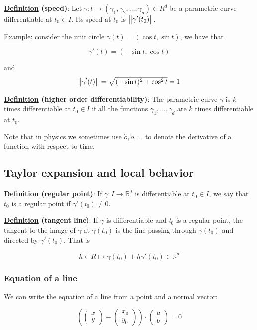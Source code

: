 \documentclass[10pt]{extarticle}
\newcommand{\R}{\mathbb{R}}
\newcommand{\munderbar}[1]{\underbar{\ensuremath{#1}}}
\begin{document}
\textbf{\underline{Definition} (speed)}: Let $\gamma: t \to (\gamma_1, \gamma_2, \ldots, \gamma_d) \in R^d$ be a parametric curve differentiable at $t_0 \in I$.
Its speed at $t_0$ is $\norm{\gamma'(t_0)}$.

\underline{Example}: consider the unit circle $\gamma(t) = (\cos t, \sin t)$, we have that

$$
    \gamma'(t) = (-\sin t, \cos t)
$$

and
$$
    \norm{\gamma'(t)} = \sqrt{(-\sin t)^2 + \cos^2 t} = 1
$$

\textbf{\underline{Definition} (higher order differentiability)}:
The parametric curve $\gamma$ is $k$ times differentiable at $t_0 \in I$ if all the functions $\gamma_1, \ldots, \gamma_d$ are $k$ times differentiable at $t_0$.

Note that in physics we sometimes use $\dot{o}, \ddot{o}, \ldots$ to denote the derivative of a function with respect to time.

\subsection{Taylor expansion and local behavior}

\textbf{\underline{Definition} (regular point)}:
If $\gamma: I \to \R^d$ is differentiable at $t_0 \in I$, we say that $t_0$ is a regular point if $\gamma'(t_0) \neq \munderbar{0}$.

\textbf{\underline{Definition} (tangent line)}:
If $\gamma$ is differentiable and $t_0$ is a regular point, the tangent to the image of $\gamma$ at $\gamma(t_0)$ is the line passing through $\gamma(t_0)$ and directed by $\gamma'(t_0)$.
That is

$$
    h \in R \mapsto \gamma(t_0) + h \gamma'(t_0) \in \R^d
$$

\subsubsection{Equation of a line}

We can write the equation of a line from a point and a normal vector:

$$
    \left(
    \begin{pmatrix}
            x \\ y
        \end{pmatrix} - \begin{pmatrix}
            x_0 \\ y_0
        \end{pmatrix}
    \right) \cdot \begin{pmatrix}
        a \\ b
    \end{pmatrix} = 0
$$
\end{document}
